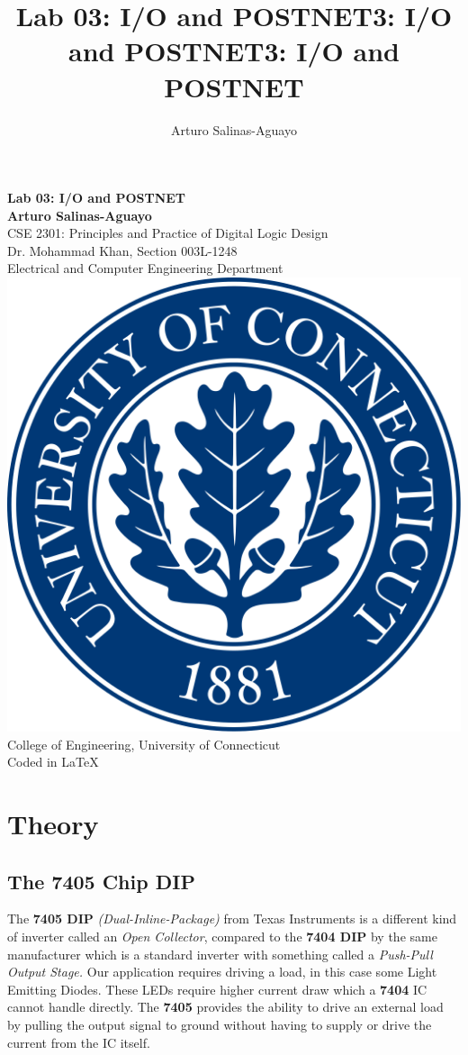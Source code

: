 \documentclass[12pt]{report}
\author{Arturo Salinas-Aguayo}
\title{Lab 03: I/O and POSTNET3: I/O and POSTNET3: I/O and POSTNET}
\begin{document}
\newcommand{\closure}[2][3]{%
	{}\mkern#1mu\overline{\mkern-#1mu#2}}
\newcommand\ncoverline[1]{\mkern1mu\overline{\mkern-1mu#1\mkern-1mu}\mkern1mu}
\begin{titlepage}
	\centering
	\vspace*{3cm}
	\huge\textbf{Lab 03: I/O and POSTNET}\\
	\vspace{5cm}
	\Large\textbf{Arturo Salinas-Aguayo}\\
	\normalsize
	CSE 2301: Principles and Practice of Digital Logic Design\\
	Dr. Mohammad Khan, Section 003L-1248\\
	Electrical and Computer Engineering Department
	\vfill
	\includegraphics[scale=0.1]{uconnlogo}\\
	College of Engineering, University of Connecticut\\
	\scriptsize{Coded in \LaTeX}
	\vspace*{1cm}
\end{titlepage}
\section*{Theory}
\subsection*{The 7405 Chip DIP}
The \textbf{7405 DIP} \textit{(Dual-Inline-Package)} from Texas Instruments is a different kind of inverter called an \textit{Open Collector}, compared to the \textbf{7404 DIP} by the same manufacturer which is a standard inverter with something called a \textit{Push-Pull Output Stage.} Our application requires driving a load, in this case some Light Emitting Diodes. These LEDs require higher current draw which a \textbf{7404} IC cannot handle directly. The \textbf{7405} provides the ability to drive an external load by pulling the output signal to ground without having to supply or drive the current from the IC itself.
\end{document}
